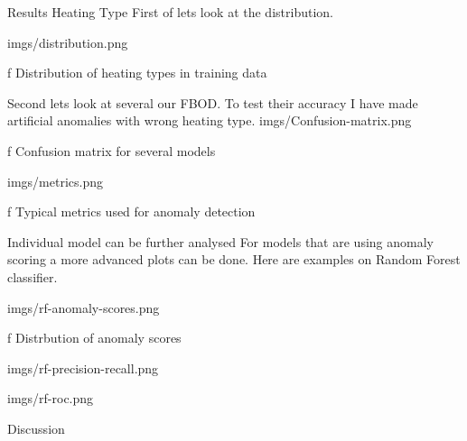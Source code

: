 
\chap Results
\sec Heating Type
First of lets look at the distribution.

\medskip
{}
\picw=15cm \cinspic imgs/distribution.png
\caption/f Distribution of heating types in training data
\medskip


Second lets look at several our FBOD. To test their accuracy I have made artificial anomalies with wrong heating type.
\medskip
{}
\picw=15cm \cinspic imgs/Confusion-matrix.png
\caption/f Confusion matrix for several models
\medskip

\medskip
{}
\picw=15cm \cinspic imgs/metrics.png
\caption/f Typical metrics used for anomaly detection
\medskip

\secc Individual model can be further analysed
For models that are using anomaly scoring a more advanced plots can be done. Here are examples on Random Forest classifier.

\medskip
\picw=15cm \cinspic imgs/rf-anomaly-scores.png
\caption/f Distrbution of anomaly scores
\medskip


\medskip
\picw=10cm \cinspic imgs/rf-precision-recall.png
\medskip

\medskip
\picw=10cm \cinspic imgs/rf-roc.png
\medskip

\sec Discussion
